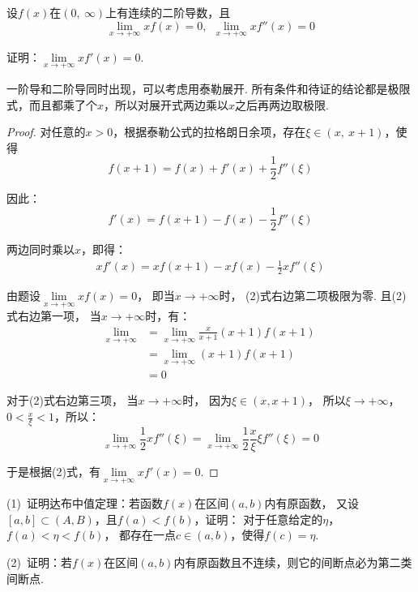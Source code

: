 \begin{example}
\label{ex:ch04-46}
设$f(x)$在$(0,~\infty)$上有连续的二阶导数，且
$$
\lim\limits_{x \to +\infty} xf(x) = 0, ~~\lim\limits_{x \to +\infty} xf''(x) = 0
$$

证明：$\lim\limits_{x \to +\infty} xf'(x) = 0$.
\end{example}

\begin{analysis}
一阶导和二阶导同时出现，可以考虑用泰勒展开.
所有条件和待证的结论都是极限式，而且都乘了个$x$，所以对展开式两边乘以$x$之后再两边取极限.
\end{analysis}

\begin{proof}
对任意的$x>0$，根据泰勒公式的拉格朗日余项，存在$\xi \in (x,~x+1)$，使得
$$
f(x+1) = f(x) + f'(x) + \frac{1}{2}f''(\xi)
$$\par
因此：
$$
f'(x) = f(x+1) - f(x) - \frac{1}{2} f''(\xi)
$$\par
两边同时乘以$x$，即得：
\begin{equation}
    \begin{aligned}
        xf'(x) = xf(x+1) - xf(x) - \frac{1}{2}xf''(\xi)
    \end{aligned}
\end{equation}

\par
由题设$\lim\limits_{x \to +\infty} xf(x) = 0$，
即当$x \to +\infty$时，
(2)式右边第二项极限为零.
且(2)式右边第一项，
当$x \to +\infty$时，有：
\begin{equation}
    \begin{aligned}
        \lim\limits_{x \to +\infty}
        &= \lim\limits_{x \to +\infty} \frac{x}{x+1} (x+1)f(x+1)\\
        &= \lim\limits_{x \to +\infty} (x+1)f(x+1) \\
        &= 0
    \end{aligned}
    \nonumber
\end{equation}

对于(2)式右边第三项，
当$x \to +\infty$时，
因为$\xi \in (x,x+1)$，
所以$\xi \to +\infty$，
$0<\frac{x}{\xi}<1$，所以：
$$
\lim\limits_{x \to +\infty} \frac{1}{2}xf''(\xi) = \lim\limits_{x \to +\infty} \frac{1}{2} \frac{x}{\xi} \xi f''(\xi) = 0
$$

于是根据(2)式，有$\lim\limits_{x \to +\infty} xf'(x) = 0$.
\end{proof}

\begin{example}
\label{ex:ch04-47}
(1)~证明达布中值定理：若函数$f(x)$在区间$(a,b)$内有原函数，
又设$[a,b] \subset (A,B)$，且$f(a)<f(b)$，证明：
对于任意给定的$\eta$，$f(a) < \eta < f(b)$，
都存在一点$c \in (a,b)$，使得$f(c) = \eta$. \par
(2)~证明：若$f(x)$在区间$(a,b)$内有原函数且不连续，则它的间断点必为第二类间断点.
\end{example}

